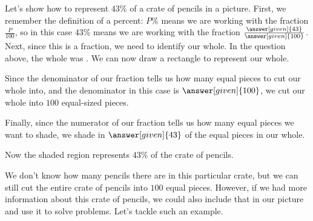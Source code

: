 \documentclass{ximera}
\begin{document}
\begin{example}
Let's show how to represent $43\%$ of a crate of pencils in a picture. First, we remember the definition of a percent: $P\%$ means we are working with the fraction $\frac{P}{100}$, so in this case $43\%$ means we are working with the fraction $\frac{\answer[given]{43}}{\answer[given]{100}}$. Next, since this is a fraction, we need to identify our whole. In the question above, the whole was . We can now draw a rectangle to represent our whole.

\begin{image}
\end{image}

Since the denominator of our fraction tells us how many equal pieces to cut our whole into, and the denominator in this case is $\answer[given]{100}$, we cut our whole into $100$ equal-sized pieces.

\begin{image}
\end{image}

Finally, since the numerator of our fraction tells us how many equal pieces we want to shade, we shade in $\answer[given]{43}$ of the equal pieces in our whole. 

\begin{image}
\end{image}

Now the shaded region represents $43\%$ of the crate of pencils. 

\end{example}

We don't know how many pencils there are in this particular crate, but we can still cut the entire crate of pencils into $100$ equal pieces. However, if we had more information about this crate of pencils, we could also include that in our picture and use it to solve problems. Let's tackle such an example.
\end{document}
